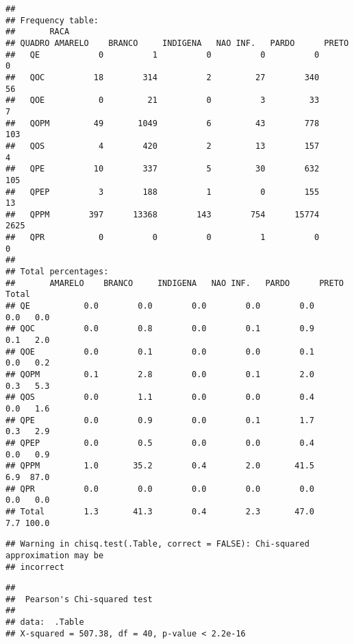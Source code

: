 \documentclass[
]{article}
\begin{document}
\begin{verbatim}
## 
## Frequency table:
##       RACA
## QUADRO AMARELO    BRANCO     INDIGENA   NAO INF.   PARDO      PRETO     
##   QE            0          1          0          0          0          0
##   QOC          18        314          2         27        340         56
##   QOE           0         21          0          3         33          7
##   QOPM         49       1049          6         43        778        103
##   QOS           4        420          2         13        157          4
##   QPE          10        337          5         30        632        105
##   QPEP          3        188          1          0        155         13
##   QPPM        397      13368        143        754      15774       2625
##   QPR           0          0          0          1          0          0
## 
## Total percentages:
##       AMARELO    BRANCO     INDIGENA   NAO INF.   PARDO      PRETO      Total
## QE           0.0        0.0        0.0        0.0        0.0        0.0   0.0
## QOC          0.0        0.8        0.0        0.1        0.9        0.1   2.0
## QOE          0.0        0.1        0.0        0.0        0.1        0.0   0.2
## QOPM         0.1        2.8        0.0        0.1        2.0        0.3   5.3
## QOS          0.0        1.1        0.0        0.0        0.4        0.0   1.6
## QPE          0.0        0.9        0.0        0.1        1.7        0.3   2.9
## QPEP         0.0        0.5        0.0        0.0        0.4        0.0   0.9
## QPPM         1.0       35.2        0.4        2.0       41.5        6.9  87.0
## QPR          0.0        0.0        0.0        0.0        0.0        0.0   0.0
## Total        1.3       41.3        0.4        2.3       47.0        7.7 100.0
\end{verbatim}

\begin{verbatim}
## Warning in chisq.test(.Table, correct = FALSE): Chi-squared approximation may be
## incorrect
\end{verbatim}

\begin{verbatim}
## 
##  Pearson's Chi-squared test
## 
## data:  .Table
## X-squared = 507.38, df = 40, p-value < 2.2e-16
\end{verbatim}
\end{document}
